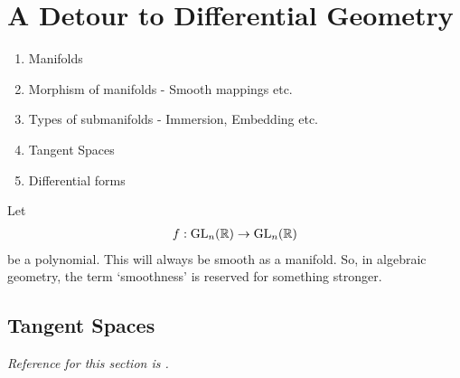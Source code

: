 \chapter{A Detour to Differential Geometry}
\label{cha:a_small_detour_to_differential_geometry}

\begin{enumerate}
    \makethislistcompact
    \item Manifolds
    \item Morphism of manifolds -  Smooth mappings etc.
    \item Types of submanifolds - Immersion, Embedding etc.
    \item Tangent Spaces
    \item Differential forms
\end{enumerate}

\begin{insight} %
    Let 
    \begin{align}
        f: \operatorname{GL}_n(\mathbb{R}) \to \operatorname{GL}_n(\mathbb{R})
    \end{align}
    be a polynomial. This will always be smooth as a manifold. So, in algebraic geometry, the term `smoothness' is reserved for something stronger.
\end{insight}

\section{Tangent Spaces}
\label{sec:tangent_spaces}

\emph{Reference for this section is \cite{brocker1982introduction}.}

